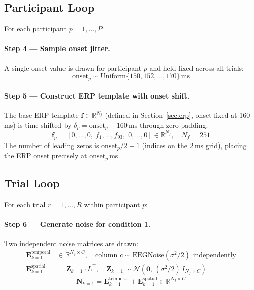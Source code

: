 \documentclass[12pt, a4paper]{article}
\begin{document}
\subsection{Participant Loop}\label{sec:ppt_loop}

For each participant $p = 1, \ldots, P$:

\paragraph{Step 4 --- Sample onset jitter.}
A single onset value is drawn for participant $p$ and held fixed across
all trials:
\[
  \mathrm{onset}_p \sim \mathrm{Uniform}\{150, 152, \ldots, 170\}\,\text{ms}
\]

\paragraph{Step 5 --- Construct ERP template with onset shift.}
The base ERP template $\mathbf{f} \in \mathbb{R}^{N_f}$ (defined in
Section~\ref{sec:erp}, onset fixed at 160\,ms) is time-shifted by
$\delta_p = \mathrm{onset}_p - 160$\,ms through zero-padding:
\[
  \mathbf{f}_p = [0, \ldots, 0,\; f_1, \ldots, f_{93},\; 0, \ldots, 0]
  \in \mathbb{R}^{N_f}, \quad N_f = 251
\]
The number of leading zeros is $\mathrm{onset}_p / 2 - 1$ (indices on the
2\,ms grid), placing the ERP onset precisely at $\mathrm{onset}_p$\,ms.

\subsection{Trial Loop}\label{sec:trial_loop}

For each trial $r = 1, \ldots, R$ within participant $p$:

\paragraph{Step 6 --- Generate noise for condition 1.}
Two independent noise matrices are drawn:
\begin{align*}
  \mathbf{E}^\text{temporal}_{k=1} &\in \mathbb{R}^{N_f \times C},
    \quad \text{column } c \sim \mathrm{EEGNoise}(\sigma^2/2)
    \text{ independently} \\
  \mathbf{E}^\text{spatial}_{k=1}  &= \mathbf{Z}_{k=1} \cdot L^\top,
    \quad \mathbf{Z}_{k=1} \sim \mathcal{N}(\mathbf{0},\, (\sigma^2/2)\, I_{N_f \times C})
\end{align*}
\[
  \mathbf{N}_{k=1} = \mathbf{E}^\text{temporal}_{k=1}
                   + \mathbf{E}^\text{spatial}_{k=1}
  \in \mathbb{R}^{N_f \times C}
\]
\end{document}
